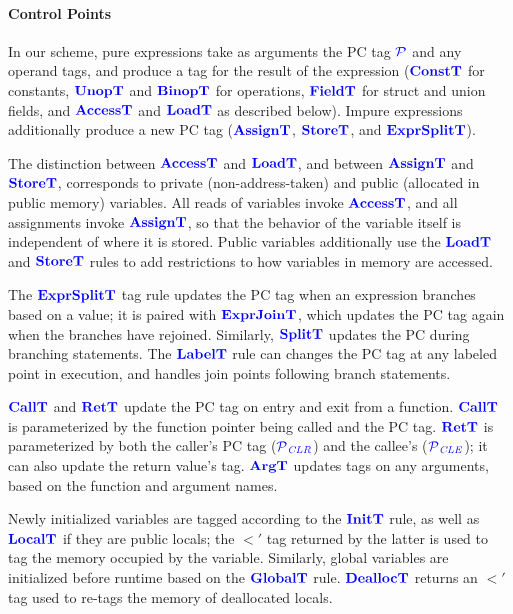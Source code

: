 \paragraph{Control Points}

In our scheme, pure expressions take as arguments the PC tag \(\PCT\) and any operand tags,
and produce a tag for the result of the expression (\(\consttname\) for constants,
\(\unoptname\) and \(\binoptname\) for operations, \(\fieldtname\) for struct and union fields,
and \(\accesstname\) and \(\loadtname\) as described below).
Impure expressions additionally produce a new PC tag (\(\assigntname\), \(\storetname\),
and \(\exprsplittname\)).

The distinction between \(\accesstname\) and \(\loadtname\), and between
\(\assigntname\) and \(\storetname\), corresponds to private (non-address-taken)
and public (allocated in public memory) variables. All reads of variables invoke
\(\accesstname\), and all assignments invoke \(\assigntname\), so that the behavior of the
variable itself is independent of where it is stored. Public variables
additionally use the \(\loadtname\) and \(\storetname\) rules to add restrictions to how
variables in memory are accessed.

The \(\exprsplittname\) tag rule updates the PC tag when an expression branches
based on a value; it is paired with \(\exprjointname\), which updates the PC tag again
when the branches have rejoined. Similarly, \(\splittname\) updates the PC during
branching statements. The \(\labeltname\) rule can changes the PC tag at any labeled point in execution,
and handles join points following branch statements. %

\(\calltname\) and \(\rettname\) update the PC tag on entry and exit from a function.
\(\calltname\) is parameterized by the function pointer being called and the PC tag.
\(\rettname\) is parameterized by both the caller's PC tag (\(\PCT[_{\color{blue} CLR}]\))
and the callee's (\(\PCT[_{\color{blue} CLE}]\)); it can also update the return value's tag.
\(\argtname\) updates tags on any arguments, based on the function and argument names.

Newly initialized variables are tagged according to the \(\inittname\) rule, as
well as \(\localtname\) if they are public locals; the \(\lt'\) tag returned by 
the latter is used to tag the memory occupied by the variable.
Similarly, global variables are initialized
before runtime based on the \(\globaltname\) rule. \(\dealloctname\) returns an
\(\lt'\) tag used to re-tags the memory of deallocated locals.

